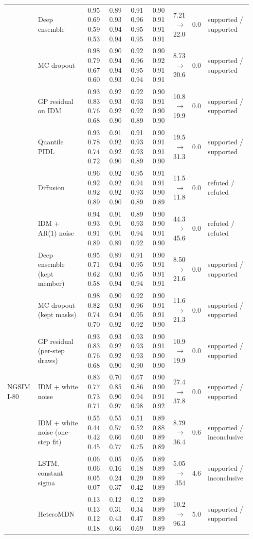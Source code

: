 \begin{longtable}{llrrrrrrl}
 & Deep ensemble & 0.95 0.69 0.59 0.53 & 0.89 0.93 0.94 0.94 & 0.91 0.96 0.95 0.95 & 0.90 0.91 0.91 0.91 & 7.21 $\rightarrow$ 22.0 & 0.0 & supported / supported \\
 & MC dropout & 0.98 0.79 0.67 0.60 & 0.90 0.94 0.94 0.93 & 0.92 0.96 0.95 0.94 & 0.90 0.92 0.91 0.91 & 8.73 $\rightarrow$ 20.6 & 0.0 & supported / supported \\
 & GP residual on IDM & 0.93 0.83 0.76 0.68 & 0.92 0.93 0.92 0.90 & 0.92 0.93 0.92 0.89 & 0.90 0.91 0.90 0.90 & 10.8 $\rightarrow$ 19.9 & 0.0 & supported / supported \\
 & Quantile PIDL & 0.93 0.78 0.74 0.72 & 0.91 0.92 0.92 0.90 & 0.91 0.93 0.93 0.89 & 0.90 0.91 0.91 0.90 & 19.5 $\rightarrow$ 31.3 & 0.0 & supported / supported \\
 & Diffusion & 0.96 0.92 0.92 0.89 & 0.92 0.92 0.92 0.90 & 0.95 0.94 0.93 0.89 & 0.91 0.91 0.90 0.89 & 11.5 $\rightarrow$ 11.8 & 0.0 & refuted / refuted \\
 & IDM + AR(1) noise & 0.94 0.93 0.91 0.89 & 0.91 0.91 0.91 0.89 & 0.89 0.93 0.94 0.92 & 0.90 0.90 0.91 0.90 & 44.3 $\rightarrow$ 45.6 & 0.0 & refuted / refuted \\
 & Deep ensemble (kept member) & 0.95 0.71 0.62 0.58 & 0.89 0.94 0.93 0.94 & 0.91 0.95 0.95 0.94 & 0.90 0.91 0.91 0.91 & 8.50 $\rightarrow$ 21.6 & 0.0 & supported / supported \\
 & MC dropout (kept masks) & 0.98 0.82 0.74 0.70 & 0.90 0.93 0.94 0.92 & 0.92 0.96 0.95 0.92 & 0.90 0.91 0.91 0.90 & 11.6 $\rightarrow$ 21.3 & 0.0 & supported / supported \\
 & GP residual (per-step draws) & 0.93 0.83 0.76 0.68 & 0.93 0.92 0.92 0.90 & 0.93 0.93 0.93 0.90 & 0.90 0.91 0.90 0.90 & 10.9 $\rightarrow$ 19.9 & 0.0 & supported / supported \\
\midrule
NGSIM I-80 & IDM + white noise & 0.83 0.77 0.73 0.71 & 0.70 0.85 0.90 0.97 & 0.67 0.86 0.94 0.98 & 0.90 0.90 0.91 0.92 & 27.4 $\rightarrow$ 37.8 & 0.0 & supported / supported \\
 & IDM + white noise (one-step fit) & 0.55 0.44 0.42 0.45 & 0.55 0.57 0.66 0.77 & 0.51 0.52 0.60 0.75 & 0.89 0.88 0.89 0.89 & 8.79 $\rightarrow$ 36.4 & 0.6 & supported / inconclusive \\
 & LSTM, constant sigma & 0.06 0.06 0.05 0.07 & 0.05 0.16 0.24 0.37 & 0.05 0.18 0.29 0.42 & 0.89 0.89 0.89 0.89 & 5.05 $\rightarrow$ 354 & 4.6 & supported / inconclusive \\
 & HeteroMDN & 0.13 0.13 0.12 0.18 & 0.12 0.31 0.43 0.66 & 0.12 0.34 0.47 0.69 & 0.89 0.89 0.89 0.89 & 10.2 $\rightarrow$ 96.3 & 5.0 & supported / supported \\

\end{longtable}

